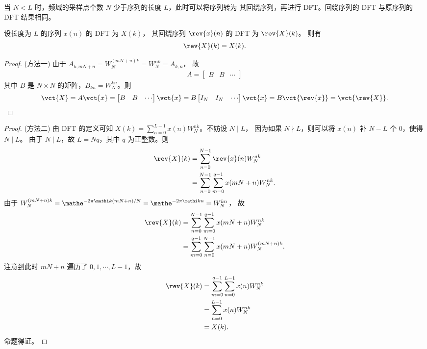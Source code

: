 \begin{example}[$N < L$ 的情况]
    当 $N < L$ 时，频域的采样点个数 $N$ 少于序列的长度 $L$，此时可以将序列转为
    其回绕序列，再进行 DFT。回绕序列的 DFT 与原序列的 DFT 结果相同。
\end{example}

\begin{theorem}
    设长度为 $L$ 的序列 $x(n)$ 的 DFT 为 $X(k)$，
    其回绕序列 $\rev{x}(n)$ 的 DFT 为 $\rev{X}(k)$。
    则有
    \begin{align*}
        \rev{X}(k) = X(k).
    \end{align*}
\end{theorem}

\begin{proof}
    (方法一)
    由于 $A_{k, mN + n} = W_N^{(mN + n)k} = W_N^{nk} = A_{k, n}$，
    故
    \begin{align*}
        A = \begin{bmatrix}
            B & B & \cdots
        \end{bmatrix}
    \end{align*}
    其中 $B$ 是 $N \times N$ 的矩阵，$B_{kn} = W_N^{kn}$。则
    \begin{align*}
        \vct{X} = A\vct{x} = \begin{bmatrix}
            B & B & \cdots
        \end{bmatrix} \vct{x}
        = B\begin{bmatrix}
            I_N & I_N & \cdots
        \end{bmatrix}\vct{x}
        = B\vct{\rev{x}} = \vct{\rev{X}}.
    \end{align*}
\end{proof}

\begin{proof}
    (方法二)
    由 DFT 的定义可知 $X(k) = \sum_{n = 0}^{L - 1}x(n)W_N^{nk}$。不妨设 $N \mid L$，
    因为如果 $N \nmid L$，则可以将 $x(n)$ 补 $N - L$ 个 $0$，使得 $N \mid L$。
    由于 $N \mid L$，故 $L = Nq$，其中 $q$ 为正整数。则
    \begin{align*}
        \rev{X}(k) & = \sum_{n = 0}^{N - 1}\rev{x}(n)W_N^{nk} \\
        & = \sum_{n = 0}^{N - 1}\sum_{m = 0}^{q - 1}x(mN + n)W_N^{nk}.
    \end{align*}
    由于 $W_N^{(mN + n)k} = \mathe^{-2\pi\mathi k(mN + n)/N}
        = \mathe^{-2\pi\mathi kn} = W_N^{kn}$，
    故
    \begin{align*}
        \rev{X}(k) & = \sum_{n = 0}^{N - 1}\sum_{m = 0}^{q - 1}x(mN + n)W_N^{nk} \\
        & = \sum_{m = 0}^{q - 1}\sum_{n = 0}^{N - 1}x(mN + n)W_N^{(mN + n)k}.
    \end{align*}
    注意到此时 $mN + n$ 遍历了 $0, 1, \cdots, L - 1$，故
    \begin{align*}
        \rev{X}(k) & = \sum_{m = 0}^{q - 1}\sum_{n = 0}^{L - 1}x(n)W_N^{nk} \\
        & = \sum_{n = 0}^{L - 1}x(n)W_N^{nk} \\
        & = X(k).
    \end{align*}
    命题得证。
\end{proof}

